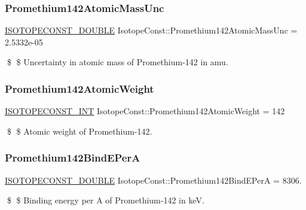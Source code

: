 \subsubsection{\texorpdfstring{Promethium142\+Atomic\+Mass\+Unc}{Promethium142AtomicMassUnc}}
{\footnotesize\ttfamily \mbox{\hyperlink{group___isotope_const-_macros_ga8f45a7272ce02c0b4c65c44636ed719a}{I\+S\+O\+T\+O\+P\+E\+C\+O\+N\+S\+T\+\_\+\+D\+O\+U\+B\+LE}} Isotope\+Const\+::\+Promethium142\+Atomic\+Mass\+Unc = 2.\+5332e-\/05}

\$ \$ Uncertainty in atomic mass of Promethium-\/142 in amu. \mbox{\label{group___isotope_const-_promethium-_pm142_gac099bb72c5ac9bc26178e7ddf595bc26}} 
\subsubsection{\texorpdfstring{Promethium142\+Atomic\+Weight}{Promethium142AtomicWeight}}
{\footnotesize\ttfamily \mbox{\hyperlink{group___isotope_const-_macros_ga5f18360b3e99483a35c32d789e62621c}{I\+S\+O\+T\+O\+P\+E\+C\+O\+N\+S\+T\+\_\+\+I\+NT}} Isotope\+Const\+::\+Promethium142\+Atomic\+Weight = 142}

\$ \$ Atomic weight of Promethium-\/142. \mbox{\label{group___isotope_const-_promethium-_pm142_ga0f23a2aebf2203f81731d389f99f14aa}} 
\subsubsection{\texorpdfstring{Promethium142\+Bind\+E\+PerA}{Promethium142BindEPerA}}
{\footnotesize\ttfamily \mbox{\hyperlink{group___isotope_const-_macros_ga8f45a7272ce02c0b4c65c44636ed719a}{I\+S\+O\+T\+O\+P\+E\+C\+O\+N\+S\+T\+\_\+\+D\+O\+U\+B\+LE}} Isotope\+Const\+::\+Promethium142\+Bind\+E\+PerA = 8306.}

\$ \$ Binding energy per A of Promethium-\/142 in keV. \mbox{\label{group___isotope_const-_promethium-_pm142_ga80ff18284cca6d145c43bd2b659342a3}} 
